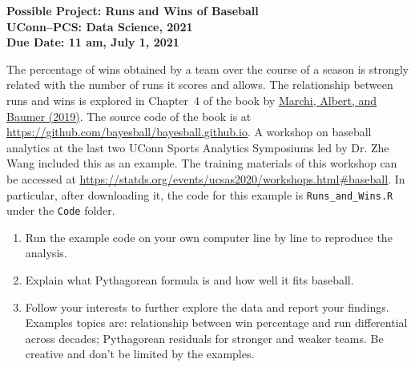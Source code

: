 \documentclass[12pt]{article}
\begin{document}
\begin{center}
  \bf Possible Project: Runs and Wins of Baseball\\
  UConn--PCS: Data Science, 2021\\
  Due Date: 11 am, July 1, 2021
\end{center}

The percentage of wins obtained by a team over the course of a season
is strongly related with the number of runs it scores and allows. The
relationship between runs and wins is explored in Chapter~4 of the
book by
\href{https://www.amazon.com/gp/product/B07KRNP2BB/ref=dbs_a_def_rwt_bibl_vppi_i0}{Marchi,
  Albert, and Baumer (2019)}.
The source code of the book is at
\url{https://github.com/bayesball/bayesball.github.io}.
A workshop on baseball analytics at the last two UConn Sports
Analytics Symposiums led by Dr. Zhe Wang included this as an
example. The training materials of this workshop can be accessed at
\url{https://statds.org/events/ucsas2020/workshops.html#baseball}.
In particular, after downloading it, the code for this example is
\texttt{Runs\_and\_Wins.R} under the \texttt{Code} folder.

\begin{enumerate}
\item
Run the example code on your own computer line by line to reproduce
the analysis.

\item
Explain what Pythagorean formula is and how well it fits baseball.

\item
Follow your interests to further explore the data and report your
findings. Examples topics are: relationship between win percentage and
run differential across decades; Pythagorean residuals for stronger
and weaker teams. Be creative and don't be limited by the
examples.

\end{enumerate}
\end{document}
